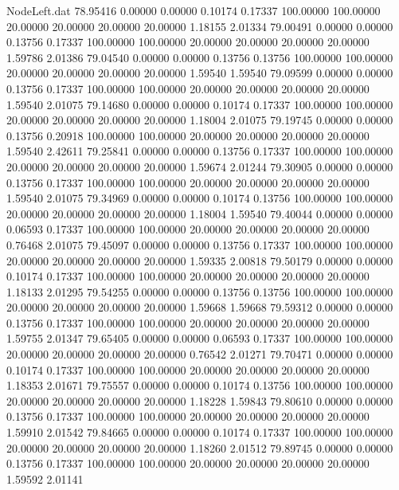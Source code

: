 \begin{filecontents}{NodeLeft.dat}
  78.95416    0.00000    0.00000     0.10174    0.17337  100.00000  100.00000   20.00000   20.00000   20.00000   20.00000    1.18155    2.01334
  79.00491    0.00000    0.00000     0.13756    0.17337  100.00000  100.00000   20.00000   20.00000   20.00000   20.00000    1.59786    2.01386
  79.04540    0.00000    0.00000     0.13756    0.13756  100.00000  100.00000   20.00000   20.00000   20.00000   20.00000    1.59540    1.59540
  79.09599    0.00000    0.00000     0.13756    0.17337  100.00000  100.00000   20.00000   20.00000   20.00000   20.00000    1.59540    2.01075
  79.14680    0.00000    0.00000     0.10174    0.17337  100.00000  100.00000   20.00000   20.00000   20.00000   20.00000    1.18004    2.01075
  79.19745    0.00000    0.00000     0.13756    0.20918  100.00000  100.00000   20.00000   20.00000   20.00000   20.00000    1.59540    2.42611
  79.25841    0.00000    0.00000     0.13756    0.17337  100.00000  100.00000   20.00000   20.00000   20.00000   20.00000    1.59674    2.01244
  79.30905    0.00000    0.00000     0.13756    0.17337  100.00000  100.00000   20.00000   20.00000   20.00000   20.00000    1.59540    2.01075
  79.34969    0.00000    0.00000     0.10174    0.13756  100.00000  100.00000   20.00000   20.00000   20.00000   20.00000    1.18004    1.59540
  79.40044    0.00000    0.00000     0.06593    0.17337  100.00000  100.00000   20.00000   20.00000   20.00000   20.00000    0.76468    2.01075
  79.45097    0.00000    0.00000     0.13756    0.17337  100.00000  100.00000   20.00000   20.00000   20.00000   20.00000    1.59335    2.00818
  79.50179    0.00000    0.00000     0.10174    0.17337  100.00000  100.00000   20.00000   20.00000   20.00000   20.00000    1.18133    2.01295
  79.54255    0.00000    0.00000     0.13756    0.13756  100.00000  100.00000   20.00000   20.00000   20.00000   20.00000    1.59668    1.59668
  79.59312    0.00000    0.00000     0.13756    0.17337  100.00000  100.00000   20.00000   20.00000   20.00000   20.00000    1.59755    2.01347
  79.65405    0.00000    0.00000     0.06593    0.17337  100.00000  100.00000   20.00000   20.00000   20.00000   20.00000    0.76542    2.01271
  79.70471    0.00000    0.00000     0.10174    0.17337  100.00000  100.00000   20.00000   20.00000   20.00000   20.00000    1.18353    2.01671
  79.75557    0.00000    0.00000     0.10174    0.13756  100.00000  100.00000   20.00000   20.00000   20.00000   20.00000    1.18228    1.59843
  79.80610    0.00000    0.00000     0.13756    0.17337  100.00000  100.00000   20.00000   20.00000   20.00000   20.00000    1.59910    2.01542
  79.84665    0.00000    0.00000     0.10174    0.17337  100.00000  100.00000   20.00000   20.00000   20.00000   20.00000    1.18260    2.01512
  79.89745    0.00000    0.00000     0.13756    0.17337  100.00000  100.00000   20.00000   20.00000   20.00000   20.00000    1.59592    2.01141
\end{filecontents}
